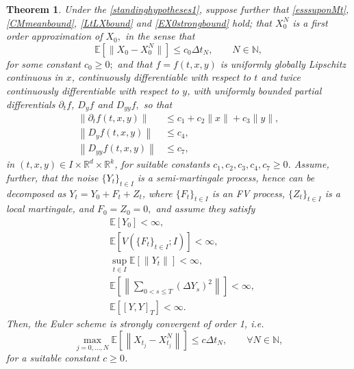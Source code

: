 \documentclass[reqno,12pt]{amsart}
\theoremstyle{plain} %
\newtheorem{theorem}{Theorem}[section]
\theoremstyle{definition} %
\begin{document}
\begin{theorem}
    \label{thmsemimartingaleunif}
    Under the \cref{standinghypotheses1}, suppose further that \eqref{esssuponMt}, \eqref{CMmeanbound}, \eqref{LtLXbound} and \eqref{EX0strongbound} hold; that $X_0^N$ is a first order approximation of $X_0,$ in the sense that 
    \begin{equation}
        \label{EX0X0Nunif}
        \mathbb{E}[\|X_0 - X_0^N\|] \leq c_0 \Delta t_N, \qquad N\in \mathbb{N},
    \end{equation}
    for some constant $c_0 \geq 0;$ and that $f=f(t, x, y)$ is uniformly globally Lipschitz continuous in $x$, continuously differentiable with respect to $t$ and twice continuously differentiable with respect to $y$, with uniformly bounded partial differentials $\partial_t f$, $D_y f$ and $D_{yy} f,$ so that
    \begin{align}
        \label{ftfyunifboundcadlagfvpartialt}
        \left\|\partial_t f(t, x, y)\right\| & \leq c_1 + c_2\|x\| + c_3\|y\|, \\
        \label{ftfyunifboundcadlagfvpartialy}
        \left\|D_y f(t, x, y)\right\| & \leq c_4, \\
        \label{ftfyunifboundcadlagfvpartialyy}
        \left\|D_{yy} f(t, x, y)\right\| & \leq c_7,
    \end{align}
    in $(t, x, y)\in I\times \mathbb{R}^d\times \mathbb{R}^k$, for suitable constants $c_1, c_2, c_3, c_4, c_7 \geq 0$. Assume, further, that the noise $\{Y_t\}_{t\in I}$ is a semi-martingale process, hence can be decomposed as $Y_t = Y_0 + F_t + Z_t$, where $\{F_t\}_{t\in I}$ is an FV process, $\{Z_t\}_{t\in I}$ is a local martingale, and $F_0 = Z_0 = 0,$ and assume they satisfy
    \begin{align}
        \label{Y0finiteexpectation}
        & \mathbb{E}\left[Y_0\right] < \infty, \\
        \label{expectFVFtfinite}
        & \mathbb{E}\left[V(\{F_t\}_{t\in I}; I)\right] < \infty, \\
        \label{expectZtfinite}
        & \sup_{t\in I} \mathbb{E}\left[\|Y_t\|\right] < \infty, \\
        \label{expectquadraticjumptsfinite}
        & \mathbb{E}\left[\left\|\sum_{0 < s \leq T}\left( \Delta Y_s \right)^2\right\|\right] < \infty, \\
        \label{expectquadraticvarfinite}
        & \mathbb{E}[[Y, Y]_T] < \infty.
    \end{align}   
    Then, the Euler scheme is strongly convergent of order 1, i.e.
    \begin{equation}
        \label{ordersemimartingaleunif}
        \max_{j=0, \ldots, N} \mathbb{E}\left[\left\| X_{t_j} - X_{t_j}^N \right\|\right] \leq c \Delta t_N, \qquad \forall N \in \mathbb{N},
    \end{equation}
    for a suitable constant $c\geq 0$.
\end{theorem}
\end{document}
